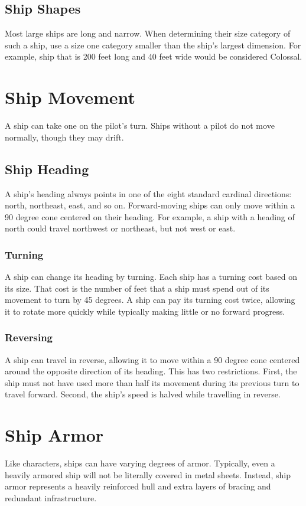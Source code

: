   \subsection{Ship Shapes}
    Most large ships are long and narrow.
    When determining their size category of such a ship, use a size one category smaller than the ship's largest dimension.
    For example, ship that is 200 feet long and 40 feet wide would be considered Colossal.

\section{Ship Movement}
  A ship can take one  on the pilot's turn.
  Ships without a pilot do not move normally, though they may drift.

  \subsection{Ship Heading}
    A ship's heading always points in one of the eight standard cardinal directions: north, northeast, east, and so on.
    Forward-moving ships can only move within a 90 degree cone centered on their heading.
    For example, a ship with a heading of north could travel northwest or northeast, but not west or east.

    \subsubsection{Turning}
      A ship can change its heading by turning.
      Each ship has a turning cost based on its size.
      That cost is the number of feet that a ship must spend out of its movement to turn by 45 degrees.
      A ship can pay its turning cost twice, allowing it to rotate more quickly while typically making little or no forward progress.

    \subsubsection{Reversing}
      A ship can travel in reverse, allowing it to move within a 90 degree cone centered around the opposite direction of its heading.
      This has two restrictions.
      First, the ship must not have used more than half its movement during its previous turn to travel forward.
      Second, the ship's speed is halved while travelling in reverse.

\section{Ship Armor}\label{Ship Armor}
  Like characters, ships can have varying degrees of armor.
  Typically, even a heavily armored ship will not be literally covered in metal sheets.
  Instead, ship armor represents a heavily reinforced hull and extra layers of bracing and redundant infrastructure.

